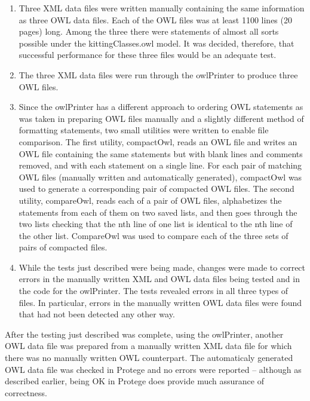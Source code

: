 \begin{enumerate}
\item Three XML data files were written manually containing the same
  information as three OWL data files. Each of the OWL files was at least
  1100 lines (20 pages) long. Among the three there were statements of
  almost all sorts possible under the kittingClasses.owl model. It was
  decided, therefore, that successful performance for these three files
  would be an adequate test.
\item The three XML data files were run through the owlPrinter to produce
  three OWL files.
\item Since the owlPrinter has a different approach to ordering OWL
  statements as was taken in preparing OWL files manually and a slightly
  different method of formatting statements, two small utilities were
  written to enable file comparison. The first utility, compactOwl, reads
  an OWL file and writes an OWL file containing the same statements but
  with blank lines and comments removed, and with each statement on a
  single line. For each pair of matching OWL files (manually written and
  automatically generated), compactOwl was used to generate a corresponding
  pair of compacted OWL files. The second utility, compareOwl, reads each
  of a pair of OWL files, alphabetizes the statements from each of them on
  two saved lists, and then goes through the two lists checking that the
  nth line of one list is identical to the nth line of the other list.
  CompareOwl was used to compare each of the three sets of pairs of
  compacted files.
\item While the tests just described were being made, changes were made to
  correct errors in the manually written XML and OWL data files being
  tested and in the code for the owlPrinter. The tests revealed errors in
  all three types of files. In particular, errors in the manually written
  OWL data files were found that had not been detected any other way.
\end{enumerate}

After the testing just described was complete, using the owlPrinter,
another OWL data file was prepared from a manually written XML data file
for which there was no manually written OWL counterpart. The automaticaly
generated OWL data file was checked in Protege and no errors were reported
-- although as described earlier, being OK in Protege does provide much
assurance of correctness.

